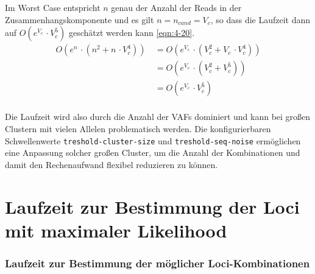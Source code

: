 Im Worst Case entspricht $ n $ genau der Anzahl der Reads in der Zusammenhangskomponente und es gilt $ n = n_{cand} = V_{c} $, so dass die Laufzeit dann auf $ O(e^{V_{c}} \, \cdotp V_{c}^5) $ geschätzt werden kann \eqref{eqn:4-20}.
\begin{equation} \label{eqn:4-20}
\tag{4-20}
\begin{aligned}
O(e^n \, \cdotp (n^2 + n \, \cdotp V_{c}^4))
&\ {} = O(e^{V_{c}} \, \cdotp (V_{c}^2 + V_{c} \, \cdotp V_{c}^4))\\
&\ = O(e^{V_{c}} \, \cdotp (V_{c}^2 + V_{c}^5))\\
&\ = O(e^{V_{c}} \, \cdotp V_{c}^5) \\
\end{aligned}
\end{equation}

Die Laufzeit wird also durch die Anzahl der VAFs dominiert und kann bei großen Clustern mit vielen Allelen problematisch werden. Die konfigurierbaren Schwellenwerte \lstinline|treshold-cluster-size| und \lstinline|treshold-seq-noise| ermöglichen eine Anpassung solcher großen Cluster, um die Anzahl der Kombinationen und damit den Rechenaufwand flexibel reduzieren zu können.


\section{Laufzeit zur Bestimmung der Loci mit maximaler Likelihood}

\subsubsection{Laufzeit zur Bestimmung der möglicher Loci-Kombinationen}

